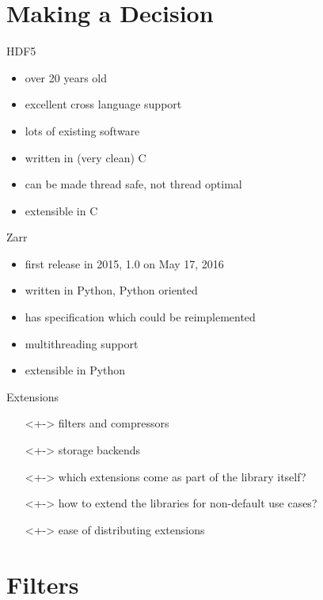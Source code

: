 \documentclass{beamer}
\begin{document}
\section{Making a Decision}

\begin{frame}{HDF5}
  \begin{itemize}
  \item<+-> over 20 years old
  \item<+-> excellent cross language support
  \item<+-> lots of existing software
  \item<+-> written in (very clean) C
  \item<+-> can be made thread safe, not thread optimal
  \item<+-> extensible in C
  \end{itemize}
\end{frame}

\begin{frame}{Zarr}
  \begin{itemize}
  \item<+-> first release in 2015, 1.0 on May 17, 2016
  \item<+-> written in Python, Python oriented
  \item<+-> has specification which could be reimplemented
  \item<+-> multithreading support
  \item<+-> extensible in Python
  \end{itemize}
\end{frame}

\begin{frame}{Extensions}
  \begin{itemize}
  \item[]<+-> filters and compressors
  \item[]<+-> storage backends
  \item[]<+-> which extensions come as part of the library itself?
  \item[]<+-> how to extend the libraries for non-default use cases?
  \item[]<+-> ease of distributing extensions
  \end{itemize}
\end{frame}

\section{Filters}
\end{document}
